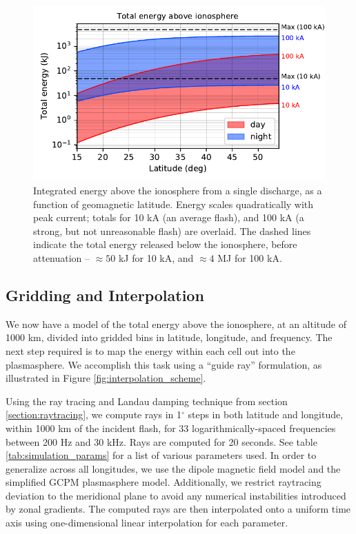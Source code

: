 \begin{figure}[h!]
\begin{center}
\includegraphics{figures/total_energy.pdf}
\caption[Energy above the ionosphere due to a single flash]{Integrated energy above the ionosphere from a single discharge, as a function of geomagnetic latitude. Energy scales quadratically with peak current; totals for 10 kA (an average flash), and 100 kA (a strong, but not unreasonable flash) are overlaid. The dashed lines indicate the total energy released below the ionosphere, before attenuation -- $\approx 50$ kJ for 10 kA, and $\approx 4$ MJ for 100 kA.}
\label{fig:illumination_totals}
\end{center}
\end{figure}


\subsection{Gridding and Interpolation}

We now have a model of the total energy above the ionosphere, at an altitude of 1000 km, divided into gridded bins in latitude, longitude, and frequency. The next step required is to map the energy within each cell out into the plasmasphere. We accomplish this task using a ``guide ray'' formulation, as illustrated in Figure \ref{fig:interpolation_scheme}.

Using the ray tracing and Landau damping technique from section \ref{section:raytracing}, we compute rays in 1$^\circ$ steps in both latitude and longitude, within 1000 km of the incident flash, for 33 logarithmically-spaced frequencies between 200 Hz and 30 kHz. Rays are computed for 20 seconds. See table \ref{tab:simulation_params} for a list of various parameters used. In order to generalize across all longitudes, we use the dipole magnetic field model and the simplified GCPM plasmasphere model. Additionally, we restrict raytracing deviation to the meridional plane to avoid any numerical instabilities introduced by zonal gradients. The computed rays are then interpolated onto a uniform time axis using one-dimensional linear interpolation for each parameter. 

